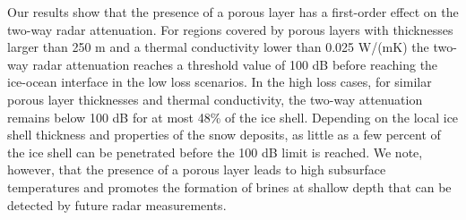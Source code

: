\documentclass[11pt]{article}
\begin{document}
Our results show that the presence of a porous layer has a first-order effect on the two-way radar attenuation. For regions covered by porous layers with thicknesses larger than 250 m and a thermal conductivity lower than 0.025 W/(mK) the two-way radar attenuation reaches a threshold value of 100 dB before reaching the ice-ocean interface in the low loss scenarios. In the high loss cases, for similar porous layer thicknesses and thermal conductivity, the two-way attenuation remains below 100 dB for at most 48\% of the ice shell. Depending on the local ice shell thickness and properties of the snow deposits, as little as a few percent of the ice shell can be penetrated before the 100 dB limit is reached. We note, however, that the presence of a porous layer leads to high subsurface temperatures and promotes the formation of brines at shallow depth that can be detected by future radar measurements.

\printbibliography[title={References}]
\end{document}
